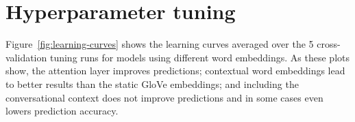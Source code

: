 \documentclass[11pt,a4paper]{article}
\newcommand{\figref}[1]{Figure~\ref{#1}}
\newcommand{\seb}[1]{\textcolor{Green}{[seb: #1]}}
\begin{document}











\clearpage

\appendix

\onecolumn






\section{Hyperparameter tuning}
\label{app:hyperparameter} \figref{fig:learning-curves} shows the  learning curves averaged over the 5 cross-validation tuning runs for models using different word embeddings. As these plots show, the attention layer improves predictions; contextual word embeddings lead to better results than the static GloVe embeddings; and including the conversational context does not improve predictions and in some cases even lowers prediction accuracy.
\end{document}
